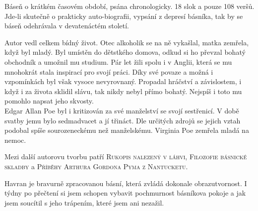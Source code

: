 \documentclass{extarticle} %
\begin{document}
\noindent 
Báseň o krátkém časovém období, psána chronologicky. 18 slok a pouze 108 veršů.
Jde-li skutečně o prakticky auto-biografii, vypsání z depresí básníka, tak by se báseň odehrávala
v devatenáctém století.







\noindent 
Autor vedl celkem bídný život.
Otec alkoholik se na ně vykašlal, matka zemřela, když byl mladý.
Byl umístěn do dětstkého domova, odkud si ho převzal bohatý obchodník a umožnil mu studium.
Pár let žili spolu i v Anglii, která se mu mnohokrát stala inspirací pro svojí práci.
Díky své povaze a možná i vzpomínkách byl však vysoce nevyrovnaný.
Propadal hráčství a závislostem, i když i za života sklidil slávu, tak nikdy nebyl přímo bohatý.
Nejspíš i toto mu pomohlo napsat jeho skvosty.\\
Edgar Allan Poe byl i kritizován za své manželství se svojí sestřenicí.
V době svatby jemu bylo sedmadvacet a jí třináct.
Dle určitých zdrojů se jejich vztah podobal spíše sourozeneckému než manželskému.
Virginia Poe zemřela mladá na nemoc.


\noindent Mezi další autorovu tvorbu patří \textsc{Rukopis nalezený v láhvi},
\textsc{Filozofie básnické skladby} a \textsc{Příběhy Arthura Gordona Pyma z Nantucketu}.






\noindent 
Havran je bravurně zpracovanou básní, která zvládá dokonale obrazutvornost. I týdny po přečtení si jsem schopen vybavit pochmurnost básníkova pokoje a jak jsem soucítil s jeho trápením, které jsem ani nezažil.
\end{document}
